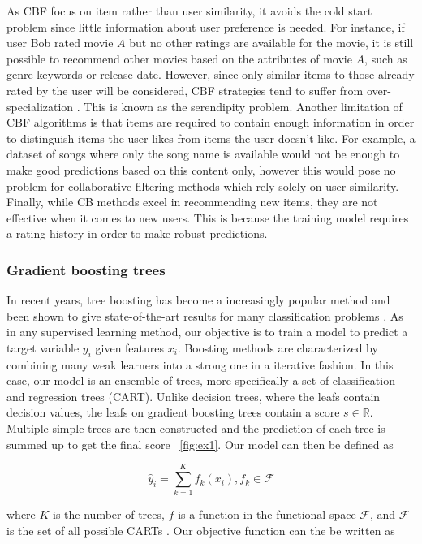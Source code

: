 \documentclass[cic,tc,english]{iiufrgs}
\begin{document}
As CBF focus on item rather than user similarity, it avoids the cold start problem since little information about user preference is needed. For instance, if user Bob rated movie $A$ but no other ratings are available for the movie, it is still possible to recommend other movies based on the attributes of movie $A$, such as genre keywords or release date. However, since only similar items to those already rated by the user will be considered, CBF strategies tend to suffer from over-specialization \cite{Iaquinta2008}. This is known as the serendipity problem. Another limitation of CBF algorithms is that items are required to contain enough information in order to distinguish items the user likes from items the user doesn't like. For example, a dataset of songs where only the song name is available would not be enough to make good predictions based on this content only, however this would pose no problem for collaborative filtering methods which rely solely on user similarity. Finally, while CB methods excel in recommending new items, they are not effective when it comes to new users. This is because the training model requires a rating history in order to make robust predictions.

\subsubsection{Gradient boosting trees}
In recent years, tree boosting has become a increasingly popular method and been shown to give state-of-the-art results for many classification problems \cite{Li2012}. As in any supervised learning method, our objective is to train a model to predict a target variable \(y_i\) given features \(x_i\). Boosting methods are characterized by combining many weak learners into a strong one in a iterative fashion. In this case, our model is an ensemble of trees, more specifically a set of classification and regression trees (CART). Unlike decision trees, where the leafs contain decision values, the leafs on gradient boosting trees contain a score \(s \in \mathbb{R}\). Multiple simple trees are then constructed and the prediction of each tree is summed up to get the final score ~\ref{fig:ex1}. Our model can then be defined as

$$\hat{y}_i = \sum_{k=1}^K f_k(x_i), f_k \in \mathcal{F}$$

where \(K\) is the number of trees, \(f\) is a function in the functional space $\mathcal{F}$, and $\mathcal{F}$ is the set of all possible CARTs \cite{Chen2016}. Our objective function can the be written as
\end{document}
